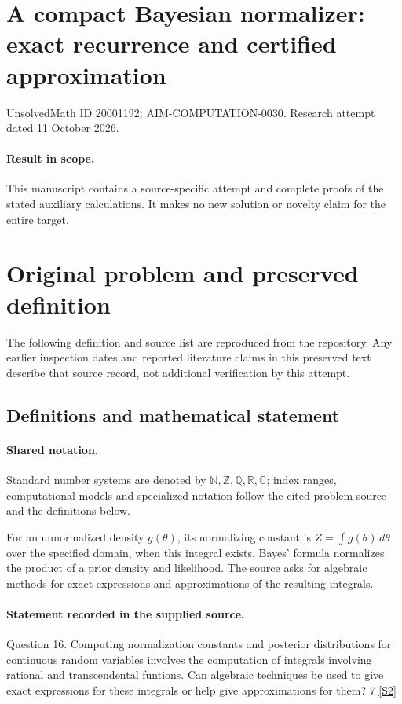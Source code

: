 \documentclass[11pt]{article}
\begin{document}
\section*{A compact Bayesian normalizer: exact recurrence and certified approximation}
\noindent UnsolvedMath ID 20001192; AIM-COMPUTATION-0030. Research attempt dated 11 October 2026.
\paragraph{Result in scope.}This manuscript contains a source-specific attempt and complete proofs of the stated auxiliary calculations. It makes no new solution or novelty claim for the entire target.
\section{Original problem and preserved definition}
The following definition and source list are reproduced from the repository. Any earlier inspection dates and reported literature claims in this preserved text describe that source record, not additional verification by this attempt.
\subsection{Definitions and mathematical statement}

\paragraph{Shared notation.}Standard number systems are denoted by $\mathbb N,\mathbb Z,\mathbb Q,\mathbb R,\mathbb C$; index ranges, computational models and specialized notation follow the cited problem source and the definitions below.


For an unnormalized density $g(\theta)$, its normalizing constant is $Z=\int g(\theta)\,d\theta$ over the specified domain, when this integral exists. Bayes' formula normalizes the product of a prior density and likelihood. The source asks for algebraic methods for exact expressions and approximations of the resulting integrals.
\paragraph{Statement recorded in the supplied source.}
Question 16. Computing normalization constants and posterior distributions for continuous random variables involves the computation of integrals involving rational and transcendental funtions. Can algebraic techniques be used to give exact expressions for these integrals or help give approximations for them? 7 \href{https://aimath.org/WWN/compalgstat/compalgstat.pdf}{[S2]}
\end{document}
